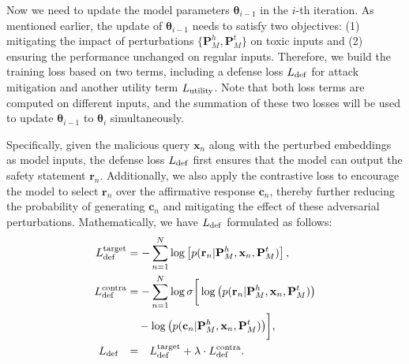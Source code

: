 
Now we need to update the model parameters $\boldsymbol\theta_{i-1}$ in the $i$-th iteration. As mentioned earlier, the update of $\boldsymbol\theta_{i-1}$ needs to satisfy two objectives: (1) mitigating the impact of perturbations $\{\mathbf{P}_{M}^h,\mathbf{P}_{M}^t\}$ on toxic inputs and (2) ensuring the performance unchanged on regular inputs. Therefore, we build the training loss based on two terms, including a defense loss $L_{\rm def}$ for attack mitigation and another utility term $L_{\rm utility}$. Note that both loss terms are computed on different inputs, and the summation of these two losses will be used to update $\boldsymbol\theta_{i-1}$ to $\boldsymbol\theta_{i}$ simultaneously.

Specifically, given the malicious query $\mathbf{x}_n$ along with the perturbed embeddings as model inputs, the defense loss $L_{\rm def}$ first ensures that the model can output the safety statement $\mathbf{r}_n$. Additionally, we also apply the contrastive loss to encourage the model to select $\mathbf{r}_n$ over the affirmative response $\mathbf{c}_n$, thereby further reducing the probability of generating $\mathbf{c}_n$ and mitigating the effect of these adversarial perturbations.
Mathematically, we have $L_{\rm def}$ formulated as follows:
{\small
\begin{align}\label{eq:5}
    L_{\rm def}^{\rm target} &= -\sum_{n=1}^{N} 
    \log\left[p(\mathbf{r}_{n}|\mathbf{P}_{M}^{h},\mathbf{x}_n,\mathbf{P}_{M}^{t})\right], \\
    L_{\rm def}^{\rm contra} &= -\sum_{n=1}^{N} \log \sigma \bigg[
    \log \big( p(\mathbf{r}_{n}|\mathbf{P}_{M}^{h},\mathbf{x}_n,\mathbf{P}_{M}^{t}) \big) \notag \\
    &\quad - \log \big( p(\mathbf{c}_{n}|\mathbf{P}_{M}^{h},\mathbf{x}_n,\mathbf{P}_{M}^{t}) \big)
    \bigg],  \\
    L_{\rm def} \phantom{^{\rm pl}} &=\phantom{^{\rm pl}} L_{\rm def}^{\rm target} + \lambda \cdot L_{\rm def}^{\rm contra}.
\end{align}
}










